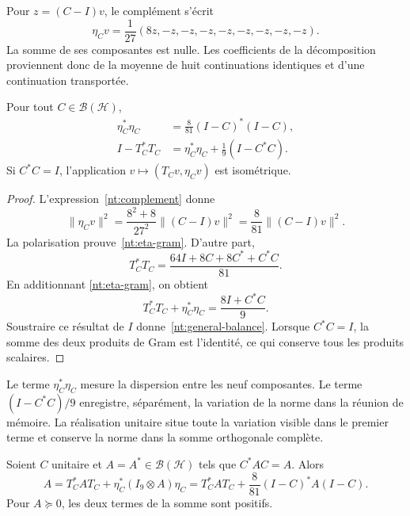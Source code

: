 Pour \(z=(C-I)v\), le complément s'écrit
\begin{equation}
 \eta_Cv=\frac1{27}(8z,-z,-z,-z,-z,-z,-z,-z,-z).
 \label{nt:complement}
\end{equation}
La somme de ses composantes est nulle. Les coefficients de la
décomposition proviennent donc de la moyenne de huit
continuations identiques et d’une continuation transportée.

\begin{proposition}
Pour tout \(C\in\mathcal B(\mathcal H)\),
\begin{align}
 \eta_C^*\eta_C
   &=\frac8{81}(I-C)^*(I-C),\label{nt:eta-gram}\\
 I-T_C^*T_C
   &=\eta_C^*\eta_C+\frac19(I-C^*C).\label{nt:general-balance}
\end{align}
Si \(C^*C=I\), l'application \(v\mapsto(T_Cv,\eta_Cv)\) est isométrique.
\end{proposition}

\begin{proof}
L’expression~\eqref{nt:complement} donne
\[
 \|\eta_Cv\|^2
 =\frac{8^2+8}{27^2}\|(C-I)v\|^2
 =\frac8{81}\|(C-I)v\|^2.
\]
La polarisation prouve~\eqref{nt:eta-gram}. D’autre part,
\[
 T_C^*T_C
 =\frac{64I+8C+8C^*+C^*C}{81}.
\]
En additionnant \eqref{nt:eta-gram}, on obtient
\[
 T_C^*T_C+\eta_C^*\eta_C=\frac{8I+C^*C}{9}.
\]
Soustraire ce résultat de \(I\) donne~\eqref{nt:general-balance}. Lorsque \(C^*C=I\), la somme des deux produits de Gram est l'identité, ce qui conserve tous les produits scalaires.
\end{proof}

Le terme \(\eta_C^*\eta_C\) mesure la dispersion entre les neuf
composantes. Le terme \((I-C^*C)/9\) enregistre, séparément,
la variation de la norme dans la réunion de mémoire. La réalisation
unitaire situe toute la variation visible dans le premier terme et
conserve la norme dans la somme orthogonale complète.

\begin{proposition}
Soient \(C\) unitaire et \(A=A^*\in\mathcal B(\mathcal H)\) tels que
\(C^*AC=A\). Alors
\begin{equation}
 A=T_C^*AT_C+
   \eta_C^*(I_9\otimes A)\eta_C
  =T_C^*AT_C+\frac8{81}(I-C)^*A(I-C).
 \label{nt:observable-balance}
\end{equation}
Pour \(A\succeq0\), les deux termes de la somme sont positifs.
\end{proposition}

